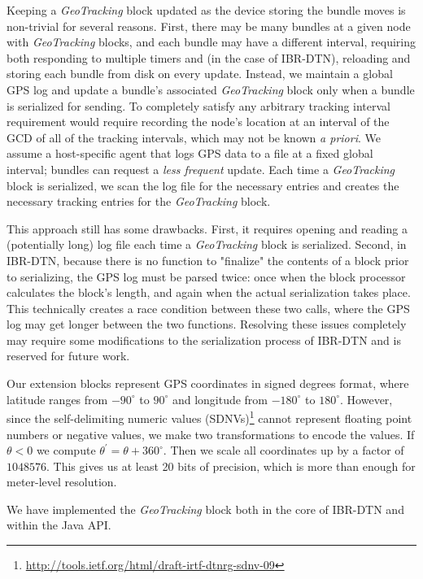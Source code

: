 Keeping a {\em GeoTracking} block updated as the device storing the bundle moves is non-trivial for several reasons. First, there may be many bundles at a given node with {\em GeoTracking} blocks, and each bundle may have a different interval, requiring both responding to multiple timers and (in the case of IBR-DTN), reloading and storing each bundle from disk on every update. Instead, we maintain a global GPS log and update a bundle's associated {\em GeoTracking} block only when a bundle is serialized for sending. 
To completely satisfy any arbitrary tracking interval requirement would require recording the node's location at an interval of the GCD of all of the tracking intervals, which may not be known {\em a priori}. We assume a host-specific agent that logs GPS data to a file at a fixed global interval; bundles can request a {\em less frequent} update. Each time a {\em GeoTracking} block is serialized, we scan the log file for the necessary entries and creates the necessary tracking entries for the {\em GeoTracking} block.

This approach still has some drawbacks.  First, it requires opening and reading a (potentially long) log file each time a {\em GeoTracking} block is serialized.  Second, in IBR-DTN, because there is no function to "finalize" the contents of a block prior to serializing, the GPS log must be parsed twice: once when the block processor calculates the block's length, and again when the actual serialization takes place.  
This technically creates a race condition between these two calls, where the GPS log may get longer between the two functions.  Resolving these issues completely may require some modifications to the serialization process of IBR-DTN and is reserved for future work.

Our extension blocks represent GPS coordinates in signed degrees format, where latitude ranges from $-90^{\circ}$ to $90^{\circ}$ and longitude from $-180^{\circ}$ to $180^{\circ}$.  However, since the self-delimiting numeric values (SDNVs)\footnote{\scriptsize\url{http://tools.ietf.org/html/draft-irtf-dtnrg-sdnv-09}} cannot represent floating point numbers or negative values, we make two transformations to encode the values.  If $\theta<0$ we compute $\theta^{\prime}=\theta+360^{\circ}$.  Then we scale all coordinates up by a factor of $1048576$.  This gives us at least 20 bits of precision, which is more than enough for meter-level resolution.

We have implemented the {\em GeoTracking} block both in the core of IBR-DTN and within the Java API.



